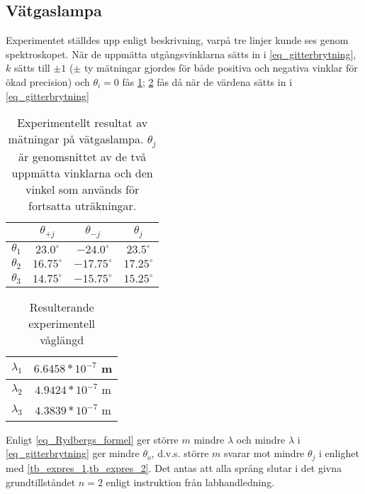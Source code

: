 \subsection*{Vätgaslampa}
Experimentet ställdes upp enligt beskrivning, varpå tre linjer kunde ses genom spektroskopet. När de uppmätta utgångsvinklarna sätts in i \cref{eq_gitterbrytning}, $k$ sätts till $\pm1$ ($\pm{}$ ty mätningar gjordes för både positiva och negativa vinklar för ökad precision) och $\theta_i=0$ fås \cref{tb_expres_1}; \cref{tb_expres_2} fås då när de värdena sätts in i \cref{eq_gitterbrytning}
\begin{table}[!hb]
	\caption{Experimentellt resultat av mätningar på vätgaslampa. $\theta_j$ är genomsnittet av de två uppmätta vinklarna och den vinkel som används för fortsatta uträkningar.}
	\label{tb_expres_1}
    \begin{center}
    	\renewcommand{\arraystretch}{1.2}
		\begin{tabular}{| c | c | c | c |}
        	\hline
			 & $\theta_{+j}$ & $\theta_{-j}$ & $\theta_{j}$ \\
            \hline
            $\theta_{1}$ & $23.0^\circ$ & $-24.0^\circ$ & $23.5^\circ$ \\
            \hline
            $\theta_{2}$ & $16.75^\circ$ & $-17.75^\circ$ & $17.25^\circ$ \\
            \hline
            $\theta_{3}$ & $14.75^\circ$ & $-15.75^\circ$ & $15.25^\circ$ \\
            \hline
		\end{tabular}
	\end{center}
\end{table}
\begin{table}[!hb]
	\caption{Resulterande experimentell våglängd}
    \label{tb_expres_2}
    \begin{center}
    	\renewcommand{\arraystretch}{1.2}
		\begin{tabular}{| c | c |}
        	\hline
            $\lambda_1$ & $6.6458*10^{-7}$ m \\
            \hline
            $\lambda_2$ & $4.9424*10^{-7}$ m \\
            \hline
            $\lambda_3$ & $4.3839*10^{-7}$ m \\
            \hline
		\end{tabular}
	\end{center}
\end{table}

Enligt \cref{eq_Rydbergs_formel} ger större $m$ mindre $\lambda$ och mindre $\lambda$ i \cref{eq_gitterbrytning} ger mindre $\theta_o$, d.v.s. större $m$ svarar mot mindre $\theta_j$ i enlighet med \cref{tb_expres_1,tb_expres_2}. Det antas att alla språng slutar i det givna grundtillståndet $n=2$ enligt instruktion från labhandledning. 

